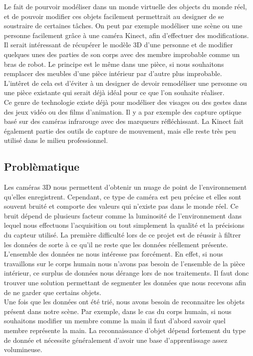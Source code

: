 Le fait de pourvoir modéliser dans un monde virtuelle des objects du monde réel, et de pouvoir modifier ces 
objets facilement permettrait au designer de se soustraire de certaines tâches. On peut par exemple modéliser
une scène ou une personne facilement grâce à une caméra Kinect, afin d'effectuer des modifications. Il serait
intéressant de récupérer le modèle 3D d'une personne et de modifier quelques unes des parties de son corps avec
des membre improbable comme un bras de robot. Le principe est le même dans une pièce, si nous souhaitons remplacer
des meubles d'une pièce intérieur par d'autre plus improbable. L'intêret de cela est d'éviter à un designer de 
devoir remodéliser une personne ou une pièce existante qui serait déjà idéal pour ce que l'on souhaite réaliser.\\

Ce genre de technologie existe déjà pour modéliser des visages ou des gestes dans des jeux vidéo ou des films d'animation. 
Il y a par exemple des capture optique basé sur des caméras infrarouge avec des marqueurs réfléchissant. La Kinect fait
également partie des outils de capture de mouvement, mais elle reste très peu utilisé dans le milieu professionnel.

\subsection{Problèmatique}
Les caméras 3D nous permettent d'obtenir un nuage de point de l'environnement qu'elles enregistrent. Cependant, ce 
type de caméra est peu précise et elles sont souvent bruité et comporte des valeurs qui n'existe pas dans le monde 
réel. Ce bruit dépend de plusieurs facteur comme la luminosité de l'environnement dans lequel nous effectuons l'acquisition
ou tout simplement la qualité et la précisions du capteur utilisé. La première difficulté lors de ce projet est de réussir 
à filtrer les données de sorte à ce qu'il ne reste que les données réellement présente.
L'ensemble des données ne nous intéresse pas forcément. En effet, si nous travaillons sur le corps humain nous n'avons
pas besoin de l'ensemble de la pièce intérieur, ce surplus de données nous dérange lors de nos traitements. Il faut
donc trouver une solution permettant de segmenter les données que nous recevons afin de ne garder que certains objets.\\ 
 
Une fois que les données ont été trié, nous avons besoin de reconnaitre les objets présent dans notre scène. Par exemple, dans
le cas du corps humain, si nous souhaitons modifier un membre comme la main il faut d'abord savoir quel membre représente 
la main. La reconnaissance d'objet dépend fortement du type de donnée et nécessite généralement d'avoir une base d'apprentissage 
assez volumineuse.\\

